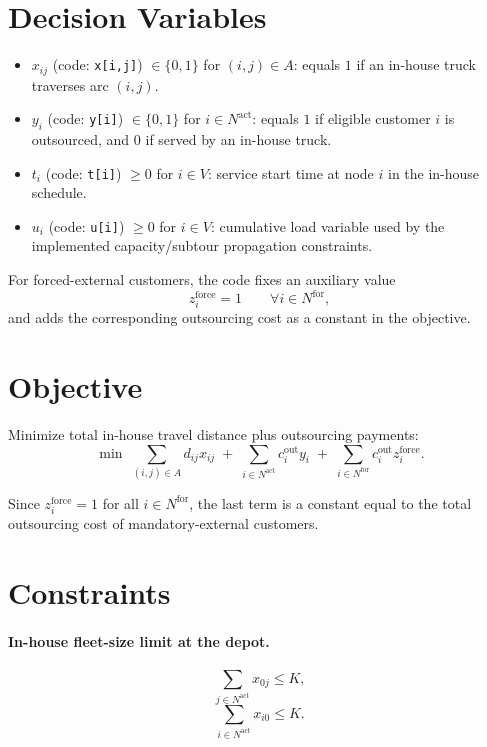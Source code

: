 \section*{Decision Variables}

\begin{itemize}
    \item $x_{ij}$ (code: \texttt{x[i,j]}) $\in \{0,1\}$ for $(i,j)\in A$: equals $1$ if an in-house truck traverses arc $(i,j)$.
    \item $y_i$ (code: \texttt{y[i]}) $\in \{0,1\}$ for $i\in N^{\mathrm{act}}$: equals $1$ if eligible customer $i$ is outsourced, and $0$ if served by an in-house truck.
    \item $t_i$ (code: \texttt{t[i]}) $\ge 0$ for $i\in V$: service start time at node $i$ in the in-house schedule.
    \item $u_i$ (code: \texttt{u[i]}) $\ge 0$ for $i\in V$: cumulative load variable used by the implemented capacity/subtour propagation constraints.
\end{itemize}

For forced-external customers, the code fixes an auxiliary value
\[
z_i^{\mathrm{force}} = 1 \qquad \forall i\in N^{\mathrm{for}},
\]
and adds the corresponding outsourcing cost as a constant in the objective.

\section*{Objective}

Minimize total in-house travel distance plus outsourcing payments:
\[
\min \;
\sum_{(i,j)\in A} d_{ij} x_{ij}
\;+\;
\sum_{i\in N^{\mathrm{act}}} c_i^{\mathrm{out}} y_i
\;+\;
\sum_{i\in N^{\mathrm{for}}} c_i^{\mathrm{out}} z_i^{\mathrm{force}}.
\]

Since $z_i^{\mathrm{force}}=1$ for all $i\in N^{\mathrm{for}}$, the last term is a constant equal to the total outsourcing cost of mandatory-external customers.

\section*{Constraints}

\paragraph{In-house fleet-size limit at the depot.}
\[
\sum_{j\in N^{\mathrm{act}}} x_{0j} \le K,
\]
\[
\sum_{i\in N^{\mathrm{act}}} x_{i0} \le K.
\]

